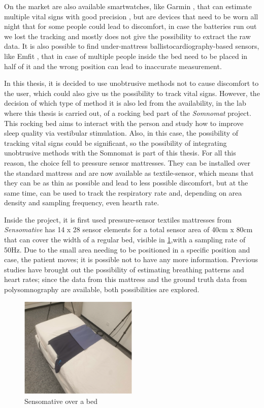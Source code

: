 On the market are also available smartwatches, like Garmin \cite{garminUrl}, that can estimate multiple vital signs with good precision \cite{GarminArticol}, but are devices that need to be worn all night that for some people could lead to discomfort, in case the batteries run out we lost the tracking and mostly does not give the possibility to extract the raw data. It is also possible to find under-mattress ballistocardiography-based sensors\cite{Tenhunen2013EmfitBreathing}, like Emfit \cite{emfitUrl}, that in case of multiple people inside the bed need to be placed in half of it and the wrong position can lead to inaccurate measurement.

In this thesis, it is decided to use unobtrusive methods not to cause discomfort to the user, which could also give us the possibility to track vital signs. 
However, the decision of which type of method it is also led from the availability, in the lab where this thesis is carried out, of a rocking bed part of the \textit{Somnomat}\cite{DevelopingSleep} project. This rocking bed aims to interact with the person and study how to improve sleep quality via vestibular stimulation. Also, in this case, the possibility of tracking vital signs could be significant, so the possibility of integrating unobtrusive methods with the Somnomat is part of this thesis.
For all this reason, the choice fell to pressure sensor mattresses.
They can be installed over the standard mattress and are now available as textile-sensor, which means that they can be as thin as possible and lead to less possible discomfort, but at the same time, can be used to track the respiratory rate and, depending on area density and sampling frequency, even hearth rate. 

Inside the project, it is first used pressure-sensor textiles mattresses from \textit{Sensomative} \cite{sensomativeUrl} has 14 x 28 sensor elements for a total sensor area of 40cm x 80cm that can cover the width of a regular bed, visible in \ref{fig:sensomativeBed},with a sampling rate of 50Hz. Due to the small area needing to be positioned in a specific position and case, the patient moves; it is possible not to have any more information. Previous studies have brought out the possibility of estimating breathing patterns and heart rates; since the data from this mattress and the ground truth data from polysomnography are available, both possibilities are explored.

\begin{figure}[h]
    \centering
    \includegraphics[width=0.5\textwidth]{img/sensomative.png}
    \caption{Sensomative over a bed}
    \label{fig:sensomativeBed}
\end{figure}


